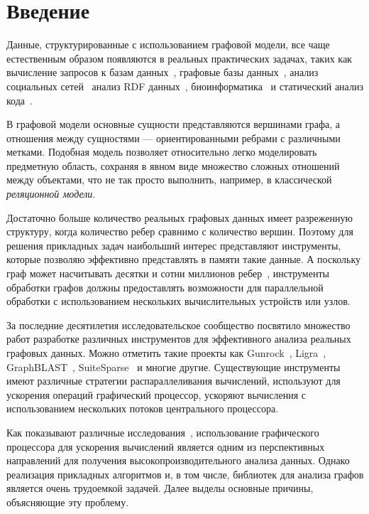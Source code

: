 \section*{Введение}

Данные, структурированные с использованием графовой модели, все чаще естественным образом появляются в реальных практических задачах, таких как вычисление запросов к базам данных~\cite{article:querying_graph_databases}, графовые базы данных~\cite{paper:redisgraph}, анализ социальных сетей~\cite{article:facebook_large_scale} анализ RDF данных~\cite{article:cfpq_and_rdf_analysis}, биоинформатика~\cite{article:rna_prediction} и статический анализ кода~\cite{article:dyck_cfl_code_analysis}. 

В графовой модели основные сущности представляются вершинами графа, а отношения между сущностями --- ориентированными ребрами с различными метками. Подобная модель позволяет относительно легко моделировать предметную область, сохраняя в явном виде множество сложных отношений между объектами, что не так просто выполнить, например, в классической \textit{реляционной модели}.

Достаточно больше количество реальных графовых данных имеет разреженную структуру, когда количество ребер сравнимо с количество вершин. Поэтому для решения прикладных задач наибольший интерес представляют инструменты, которые позволяю эффективно представлять в памяти такие данные. А поскольку граф может насчитывать десятки и сотни миллионов ребер~\cite{article:facebook_large_scale}, инструменты обработки графов должны предоставлять возможности для параллельной обработки с использованием нескольких вычислительных устройств или узлов.

За последние десятилетия исследовательское сообщество посвятило множество работ разработке различных инструментов для эффективного анализа  реальных графовых данных. Можно отметить такие проекты как Gunrock~\cite{article:gunrock}, Ligra~\cite{article:ligra},  GraphBLAST~\cite{yang2019graphblast}, SuiteSparse~\cite{article:suite_sparse_for_graph_problems} и многие другие. Существующие инструменты имеют различные стратегии распараллеливания вычислений, используют для ускорения операций графический процессор, ускоряют вычисления с использованием нескольких потоков центрального процессора. 

Как показывают различные исследования~\cite{yang2019graphblast, net:cubool_project}, использование графического процессора для ускорения вычислений является одним из перспективных направлений для получения высокопроизводительного анализа данных. Однако реализация прикладных алгоритмов и, в том числе, библиотек для анализа графов является очень трудоемкой задачей. Далее выделы основные причины, объясняющие эту проблему.

